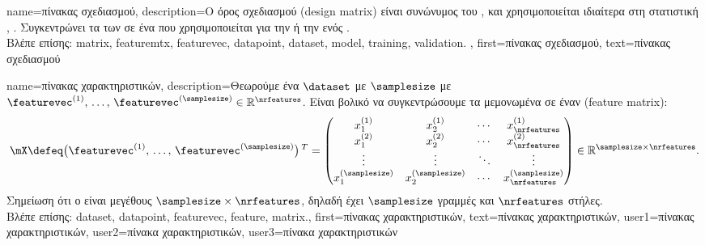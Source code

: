 {name={\foreignlanguage{greek}{πίνακας σχεδιασμού}},
	description={\foreignlanguage{greek}{Ο όρος}  
		\foreignlanguage{greek}{σχεδιασμού} (design matrix) \foreignlanguage{greek}{είναι συνώνυμος του}  
 		, \foreignlanguage{greek}{και χρησιμοποιείται ιδιαίτερα στη στατιστική} 
		\cite{OxfordStatisticsDictionary}, \cite{Everitt2022}. 
 		\foreignlanguage{greek}{Συγκεντρώνει τα}  \foreignlanguage{greek}{των}  
		\foreignlanguage{greek}{σε ένα}  \foreignlanguage{greek}{που χρησιμοποιείται για την}
 		 \foreignlanguage{greek}{ή την}  \foreignlanguage{greek}{ενός} .
		\\
		\foreignlanguage{greek}{Βλέπε επίσης:} \gls{matrix}, \gls{featuremtx}, \gls{featurevec}, \gls{datapoint}, \gls{dataset}, \gls{model}, 
		\gls{training}, \gls{validation}. }, 
 	first={\foreignlanguage{greek}{πίνακας σχεδιασμού}},
 	text={\foreignlanguage{greek}{πίνακας σχεδιασμού}} 
}

{name={\foreignlanguage{greek}{πίνακας χαρακτηριστικών}}, 
	description={\foreignlanguage{greek}{Θεωρούμε ένα}  
		$\dataset$ \foreignlanguage{greek}{με} $\samplesize$  \foreignlanguage{greek}{με}  
		$\featurevec^{(1)}, \,\ldots, \,\featurevec^{(\samplesize)} \in \mathbb{R}^{\nrfeatures}$. 
		\foreignlanguage{greek}{Εί\-ναι βολικό να συγκεντρώσουμε τα μεμονωμένα}  
		 \foreignlanguage{greek}{σε έναν}   (feature matrix):
		$$\mX \defeq \big(\featurevec^{(1)}, \,\ldots, \,\featurevec^{(\samplesize)}\big)\,^{T} =
		\begin{pmatrix}
			x^{(1)}_{1} & x^{(1)}_{2} & \cdots & x^{(1)}_{\nrfeatures} \\
			x^{(2)}_{1} & x^{(2)}_{2} & \cdots & x^{(2)}_{\nrfeatures} \\
			\vdots      & \vdots      & \ddots & \vdots \\
			x^{(\samplesize)}_{1} & x^{(\samplesize)}_{2} & \cdots & x^{(\samplesize)}_{\nrfeatures}
		\end{pmatrix}
		\in \mathbb{R}^{\samplesize \times \nrfeatures}.$$
		\foreignlanguage{greek}{Σημείωση ότι ο}   \foreignlanguage{greek}{είναι μεγέθους 
		$\samplesize \times \nrfeatures$, δηλαδή έχει $\samplesize$ γραμμές και $\nrfeatures$ στήλες}.
		\\
		\foreignlanguage{greek}{Βλέπε επίσης:} \gls{dataset}, \gls{datapoint}, \gls{featurevec}, \gls{feature}, \gls{matrix}.},
	first={\foreignlanguage{greek}{πίνακας χαρακτηριστικών}},
	text={\foreignlanguage{greek}{πίνακας χαρακτηριστικών}},
	user1={\foreignlanguage{greek}{πίνακας χαρακτηριστικών}}, %
  	user2={\foreignlanguage{greek}{πίνακα χαρακτηριστικών}}, %
	user3={\foreignlanguage{greek}{πίνακα χαρακτηριστικών}} %
}

